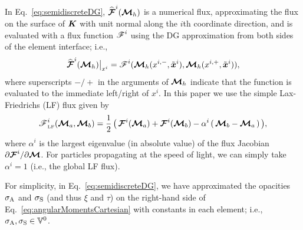 In Eq.~\eqref{eq:semidiscreteDG}, $\widehat{\boldsymbol{\mathcal{F}}}^{i}(\boldsymbol{\mathcal{M}}_{h})$ is a numerical flux, approximating the flux on the surface of $\boldsymbol{K}$ with unit normal along the $i$th coordinate direction, and is evaluated with a flux function $\boldsymbol{\mathscr{F}}^{i}$ using the DG approximation from both sides of the element interface; i.e.,
\begin{equation}
  \widehat{\boldsymbol{\mathcal{F}}}^{i}(\boldsymbol{\mathcal{M}}_{h})\big|_{x^{i}}=\boldsymbol{\mathscr{F}}^{i}(\boldsymbol{\mathcal{M}}_{h}(x^{i,-},\tilde{\boldsymbol{x}}^{i}),\boldsymbol{\mathcal{M}}_{h}(x^{i,+},\tilde{\boldsymbol{x}}^{i})),
\end{equation}
where superscripts $-/+$ in the arguments of $\boldsymbol{\mathcal{M}}_{h}$ indicate that the function is evaluated to the immediate left/right of $x^{i}$.  
In this paper we use the simple Lax-Friedrichs (LF) flux given by
\begin{equation}
  \boldsymbol{\mathscr{F}}_{\mbox{\tiny LF}}^{i}(\boldsymbol{\mathcal{M}}_{a},\boldsymbol{\mathcal{M}}_{b})
  =\frac{1}{2}\,\big(\,\boldsymbol{\mathcal{F}}^{i}(\boldsymbol{\mathcal{M}}_{a})+\boldsymbol{\mathcal{F}}^{i}(\boldsymbol{\mathcal{M}}_{b})-\alpha^{i}\,(\,\boldsymbol{\mathcal{M}}_{b}-\boldsymbol{\mathcal{M}}_{a}\,)\,\big),
  \label{eq:fluxFunctionLF}
\end{equation}
where $\alpha^{i}$ is the largest eigenvalue (in absolute value) of the flux Jacobian $\partial\boldsymbol{\mathcal{F}}^{i}/\partial\boldsymbol{\mathcal{M}}$.  
For particles propagating at the speed of light, we can simply take $\alpha^{i}=1$ (i.e., the global LF flux).  

\begin{rem}
For simplicity, in Eq.~\eqref{eq:semidiscreteDG}, we have approximated the opacities $\sigma_{{\rm A}}$ and $\sigma_{{\rm S}}$ (and thus $\xi$ and $\tau$) on the right-hand side of Eq.~\eqref{eq:angularMomentsCartesian} with constants in each element; i.e., $\sigma_{{\rm A}},\sigma_{{\rm S}}\in\mathbb{V}^{0}$.  
\end{rem}
